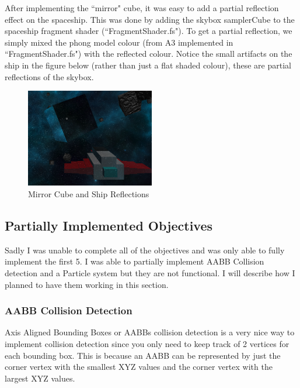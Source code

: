 \documentclass {article}
\begin{document}
After implementing the ``mirror" cube, it was easy to add a partial reflection effect on the spaceship. This was done by adding the skybox samplerCube to the spaceship fragment shader (``FragmentShader.fs"). To get a partial reflection, we simply mixed the phong model colour (from A3 implemented in ``FragmentShader.fs") with the reflected colour. Notice the small artifacts on the ship in the figure below (rather than just a flat shaded colour), these are partial reflections of the skybox.


\begin{figure}[h]
\begin{center}
	\includegraphics[width=0.5\textwidth]{reflect.png}
	\caption{Mirror Cube and Ship Reflections}
  \label{fig:bumpmap}
\end{center}
\end{figure}




\subsection{Partially Implemented Objectives}
\hspace{0.5cm}Sadly I was unable to complete all of the objectives and was only able to fully implement the first 5. I was able to partially implement AABB Collision detection and a Particle system but they are not functional. I will describe how I planned to have them working in this section.
\subsubsection{AABB Collision Detection}
\hspace{0.5cm}Axis Aligned Bounding Boxes or AABBs collision detection is a very nice  way to implement collision detection since you only need to keep track of 2 vertices for each bounding box. This is because an AABB can be represented by just the corner vertex with the smallest XYZ values and the corner vertex with the largest XYZ values. 
\end{document}
